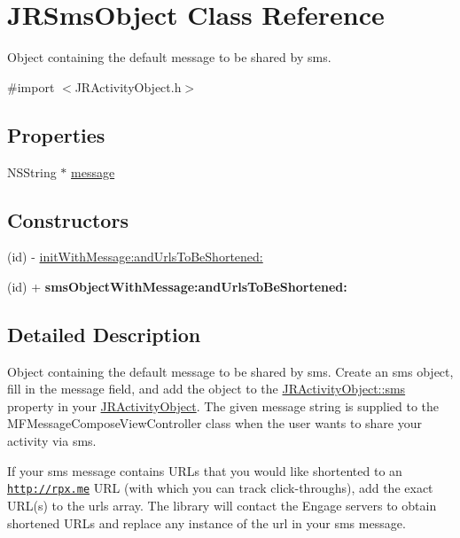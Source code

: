 \hypertarget{interface_j_r_sms_object}{
\section{JRSmsObject Class Reference}
\label{interface_j_r_sms_object}
}


Object containing the default message to be shared by sms.  




{\ttfamily \#import $<$JRActivityObject.h$>$}

\subsection*{Properties}
\begin{DoxyCompactItemize}
\item 
NSString $\ast$ \hyperlink{interface_j_r_sms_object_a6d74c049eba0e6ecfae0e25cffd77d6e}{message}
\end{DoxyCompactItemize}
\subsection*{Constructors}
\label{_amgrp559a25fdb98a7d1fd1c3771ac568d5e9}
 \begin{DoxyCompactItemize}
\item 
(id) -\/ \hyperlink{interface_j_r_sms_object_a7669f3987b203f6235c5d6e9b0b81535}{initWithMessage:andUrlsToBeShortened:}
\item 
\hypertarget{interface_j_r_sms_object_a7405d41cfdc3add99e5f8c8c8d1f9c10}{
(id) + {\bfseries smsObjectWithMessage:andUrlsToBeShortened:}}
\label{interface_j_r_sms_object_a7405d41cfdc3add99e5f8c8c8d1f9c10}

\end{DoxyCompactItemize}


\subsection{Detailed Description}
Object containing the default message to be shared by sms. Create an sms object, fill in the message field, and add the object to the \hyperlink{interface_j_r_activity_object_a7719b59135bd02dbd03d4b35b17cb0a0}{JRActivityObject::sms} property in your \hyperlink{interface_j_r_activity_object}{JRActivityObject}. The given message string is supplied to the MFMessageComposeViewController class when the user wants to share your activity via sms.

If your sms message contains URLs that you would like shortented to an \href{http://rpx.me}{\tt http://rpx.me} URL (with which you can track click-\/throughs), add the exact URL(s) to the {\ttfamily urls} array. The library will contact the Engage servers to obtain shortened URLs and replace any instance of the url in your sms message.

